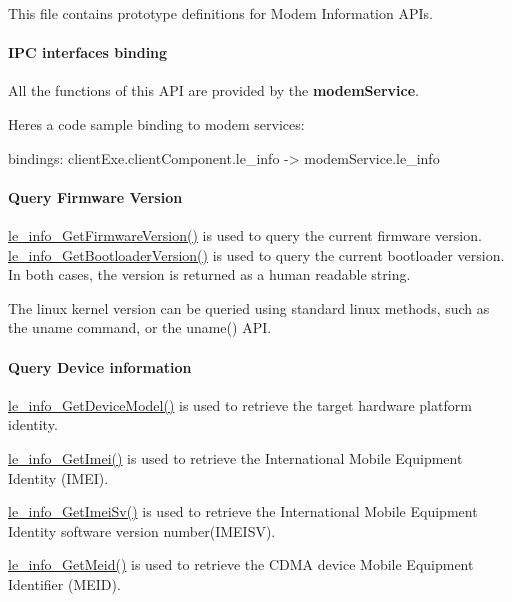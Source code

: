 This file contains prototype definitions for Modem Information A\+P\+Is.\hypertarget{c_info_le_info_binding}{}\paragraph{I\+P\+C interfaces binding}\label{c_info_le_info_binding}
All the functions of this A\+PI are provided by the {\bfseries modem\+Service}.

Here\textquotesingle{}s a code sample binding to modem services\+: \begin{DoxyVerb}bindings:
{
   clientExe.clientComponent.le_info -> modemService.le_info
}
\end{DoxyVerb}
\hypertarget{c_info_le_info_version}{}\paragraph{Query Firmware Version}\label{c_info_le_info_version}
\hyperlink{le__info__interface_8h_acde97300eedb261f4f456fba2c770935}{le\+\_\+info\+\_\+\+Get\+Firmware\+Version()} is used to query the current firmware version. \hyperlink{le__info__interface_8h_ad5a8e43d2863aee57f9f2c2bfa875c7e}{le\+\_\+info\+\_\+\+Get\+Bootloader\+Version()} is used to query the current bootloader version. In both cases, the version is returned as a human readable string.

The linux kernel version can be queried using standard linux methods, such as the uname command, or the uname() A\+PI.\hypertarget{c_info_le_info_model}{}\paragraph{Query Device information}\label{c_info_le_info_model}
\hyperlink{le__info__interface_8h_aaa2f254bbfcec747c66103d28f65d314}{le\+\_\+info\+\_\+\+Get\+Device\+Model()} is used to retrieve the target hardware platform identity.

\hyperlink{le__info__interface_8h_ab3121512fdb89b67e2a892707a4f0b30}{le\+\_\+info\+\_\+\+Get\+Imei()} is used to retrieve the International Mobile Equipment Identity (I\+M\+EI).

\hyperlink{le__info__interface_8h_a307b5d3ada4ee4b65ecaa3c5154aa953}{le\+\_\+info\+\_\+\+Get\+Imei\+Sv()} is used to retrieve the International Mobile Equipment Identity software version number(\+I\+M\+E\+I\+S\+V).

\hyperlink{le__info__interface_8h_a5c4c25da0020bba0a08237391ff711a9}{le\+\_\+info\+\_\+\+Get\+Meid()} is used to retrieve the C\+D\+MA device Mobile Equipment Identifier (M\+E\+ID).

